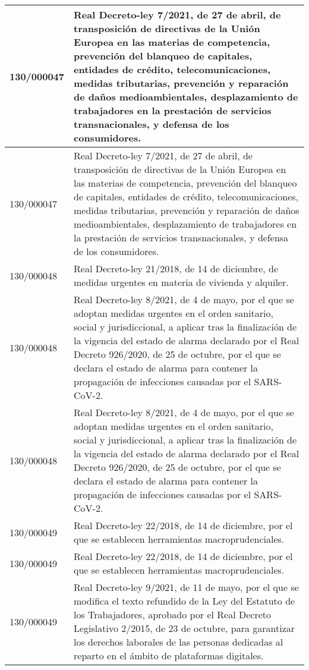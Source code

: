{\begin{table}[H]
\begin{center}
\begin{tabularx}{\linewidth}{| l | X |}
\hline
130/000047 & Real Decreto-ley 7/2021, de 27 de abril, de transposición de directivas de la Unión Europea en las materias de competencia, prevención del blanqueo de capitales, entidades de crédito, telecomunicaciones, medidas tributarias, prevención y reparación de daños medioambientales, desplazamiento de trabajadores en la prestación de servicios transnacionales, y defensa de los consumidores. \\
\hline
130/000047 & Real Decreto-ley 7/2021, de 27 de abril, de transposición de directivas de la Unión Europea en las materias de competencia, prevención del blanqueo de capitales, entidades de crédito, telecomunicaciones, medidas tributarias, prevención y reparación de daños medioambientales, desplazamiento de trabajadores en la prestación de servicios transnacionales, y defensa de los consumidores. \\
\hline
130/000048 & Real Decreto-ley 21/2018, de 14 de diciembre, de medidas urgentes en materia de vivienda y alquiler. \\
\hline
130/000048 & Real Decreto-ley 8/2021, de 4 de mayo, por el que se adoptan medidas urgentes en el orden sanitario, social y jurisdiccional, a aplicar tras la finalización de la vigencia del estado de alarma declarado por el Real Decreto 926/2020, de 25 de octubre, por el que se declara el estado de alarma para contener la propagación de infecciones causadas por el SARS-CoV-2. \\
\hline
130/000048 & Real Decreto-ley 8/2021, de 4 de mayo, por el que se adoptan medidas urgentes en el orden sanitario, social y jurisdiccional, a aplicar tras la finalización de la vigencia del estado de alarma declarado por el Real Decreto 926/2020, de 25 de octubre, por el que se declara el estado de alarma para contener la propagación de infecciones causadas por el SARS-CoV-2. \\
\hline
130/000049 & Real Decreto-ley 22/2018, de 14 de diciembre, por el que se establecen herramientas macroprudenciales. \\
\hline
130/000049 & Real Decreto-ley 22/2018, de 14 de diciembre, por el que se establecen herramientas macroprudenciales. \\
\hline
130/000049 & Real Decreto-ley 9/2021, de 11 de mayo, por el que se modifica el texto refundido de la Ley del Estatuto de los Trabajadores, aprobado por el Real Decreto Legislativo 2/2015, de 23 de octubre, para garantizar los derechos laborales de las personas dedicadas al reparto en el ámbito de plataformas digitales. \\

\end{tabularx}
\end{center}
\end{table}}
